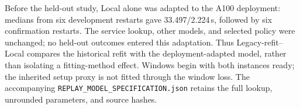 Before the held-out study, Local alone was adapted to the A100 deployment:
medians from six development restarts gave 33.497/2.224\,s, followed by six
confirmation restarts. The service lookup, other models, and selected policy
were unchanged; no held-out outcomes entered this adaptation. Thus Legacy-refit--Local
compares the historical refit with the deployment-adapted model, rather than
isolating a fitting-method effect. Windows begin with both instances ready;
the inherited setup proxy is not fitted through the window loss.
The accompanying \texttt{REPLAY\_MODEL\_SPECIFICATION.json} retains the full
lookup, unrounded parameters, and source hashes.
